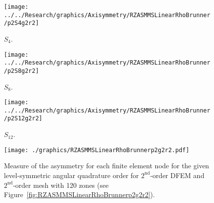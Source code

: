 \documentclass[12pt,letterpaper]{article}
\begin{document}
\begin{sidewaysfigure}[!htb]
\centering
\begin{subfigure}{0.33\textwidth}
\texttt{[image: ../../Research/graphics/Axisymmetry/RZASMMSLinearRhoBrunner/p2S4g2r2]}
\caption{$S_4$.}
\end{subfigure}%
\begin{subfigure}{0.33\textwidth}
\texttt{[image: ../../Research/graphics/Axisymmetry/RZASMMSLinearRhoBrunner/p2S8g2r2]}
\caption{$S_8$.}
\end{subfigure}%
\begin{subfigure}{0.33\textwidth}
\texttt{[image: ../../Research/graphics/Axisymmetry/RZASMMSLinearRhoBrunner/p2S12g2r2]}
\caption{$S_{12}$.}
\end{subfigure}
\caption{Relative asymmetry for $2^\text{nd}$-order finite elements on a $2^\text{nd}$-order mesh for given order of level-symmetric angular quadrature.}
\label{fig:RZASMMSLinearRhoBrunnerp2g2r2}
\end{sidewaysfigure}

\begin{figure}[!htb]
\centering
\texttt{[image: ./graphics/RZASMMSLinearRhoBrunnerp2g2r2.pdf]}
\caption{Measure of the asymmetry for each finite element node for the given level-symmetric angular quadrature order for $2^\text{nd}$-order DFEM and $2^\text{nd}$-order mesh with 120 zones (see Figure~\ref{fig:RZASMMSLinearRhoBrunnerp2g2r2}).}
\label{fig:RZASMMSLinearRhoBrunnerp2g2r2Nodes}
\end{figure}
\end{document}
